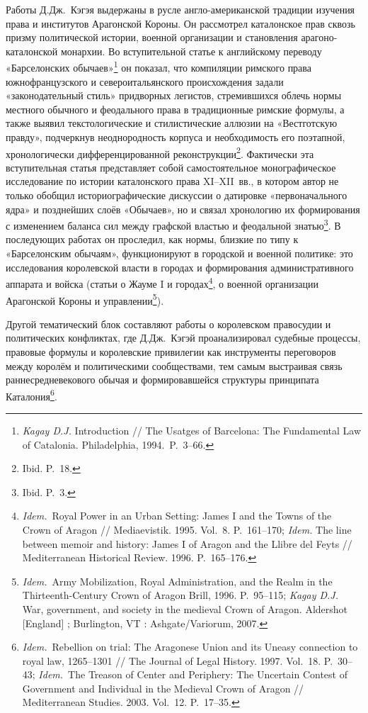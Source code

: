 Работы Д.Дж.~Кэгэя выдержаны в русле англо-американской традиции изучения права и институтов Арагонской Короны. Он рассмотрел каталонское прав сквозь призму политической истории, военной организации и становления арагоно-каталонской монархии. Во вступительной статье к английскому переводу «Барселонских обычаев»\footnote{\emph{Kagay D.J.} Introduction // The Usatges of Barcelona: The Fundamental Law of Catalonia. Philadelphia, 1994.~P.~3--66.} он показал, что компиляции римского права южнофранцузского и североитальянского происхождения задали «законодательный стиль» придворных легистов, стремившихся облечь нормы местного обычного и феодального права в традиционные римские формулы, а также выявил текстологические и стилистические аллюзии на «Вестготскую правду», подчеркнув неоднородность корпуса и необходимость его поэтапной, хронологически дифференцированной реконструкции\footnote{Ibid. P.~18.}. Фактически эта вступительная статья представляет собой самостоятельное монографическое исследование по истории каталонского права XI--XII~вв., в котором автор не только обобщил историографические дискуссии о датировке «первоначального ядра» и позднейших слоёв «Обычаев», но и связал хронологию их формирования с изменением баланса сил между графской властью и феодальной знатью\footnote{Ibid. P.~3.}. В последующих работах он проследил, как нормы, близкие по типу к «Барселонским обычаям», функционируют в городской и военной политике: это исследования королевской власти в городах и формирования административного аппарата и войска (статьи о Жауме I и городах\footnote{\emph{Idem.}~Royal Power in an Urban Setting: James I and the Towns of the Crown of Aragon // Mediaevistik. 1995. Vol.~8. P.~161--170; \emph{Idem.} The line between memoir and history: James I of Aragon and the Llibre del Feyts // Mediterranean Historical Review. 1996. P.~165--176.}, о военной организации Арагонской Короны и управлении\footnote{\emph{Idem.}~Army Mobilization, Royal Administration, and the Realm in the Thirteenth-Century Crown of Aragon Brill, 1996. P.~95--115; \emph{Kagay D.J.} War, government, and society in the medieval Crown of Aragon. Aldershot [England] ; Burlington, VT : Ashgate/Variorum, 2007.}).

Другой тематический блок составляют работы о королевском правосудии и политических конфликтах, где Д.Дж.~Кэгэй проанализировал судебные процессы, правовые формулы и королевские привилегии как инструменты переговоров между королём и политическими сообществами, тем самым выстраивая связь раннесредневекового обычая и формировавшейся структуры принципата Каталония\footnote{\emph{Idem.}~Rebellion on trial: The Aragonese Union and its Uneasy connection to royal law, 1265--1301 // The Journal of Legal History. 1997. Vol.~18. P.~30--43; \emph{Idem.}~The Treason of Center and Periphery: The Uncertain Contest of Government and Individual in the Medieval Crown of Aragon // Mediterranean Studies. 2003. Vol.~12. P.~17--35.}.

